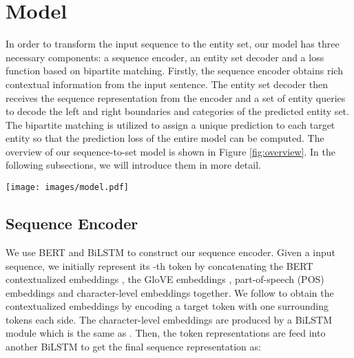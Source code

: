 \documentclass{article}
\begin{document}
\section{Model}
In order to transform the input sequence to the entity set, our model has three necessary components: a sequence encoder, an entity set decoder and a loss function based on bipartite matching. Firstly, the sequence encoder obtains rich contextual information from the input sentence. The entity set decoder then receives the sequence representation from the encoder and a set of entity queries to decode the left and right boundaries and categories of the predicted entity set. The bipartite matching is utilized to assign a unique prediction to each target entity so that the prediction loss of the entire model can be computed. The overview of our sequence-to-set model is shown in Figure \ref{fig:overview}. In the following subsections, we will introduce them in more detail.

\begin{figure*}[h]
  \centering
  \texttt{[image: images/model.pdf]}
  \caption{The architecture of our Sequence-to-Set Network. The representation of each token in sentence ``\textit{Some 2,500 Republican Guard forces surrendered.}" is fed into the entity set decoder along with the entity queries.
  Then the decoder transforms the queries to predicted entities. Finally, we score them by the loss function based on bipartite matching.}
   \label{fig:overview}
\end{figure*}

\subsection{Sequence Encoder}
We use BERT \cite{devlin-etal-2019-bert} and BiLSTM \cite{huang2015bidirectional} to construct our sequence encoder. Given a input sequence,  we initially represent its -th token by concatenating the BERT contextualized embeddings , the GloVE \cite{pennington-etal-2014-glove} embeddings , part-of-speech (POS) embeddings  and character-level embeddings  together. We follow \citep{yu2020named} to obtain the contextualized embeddings  by encoding a target token with one surrounding tokens each side. The character-level embeddings are produced by a BiLSTM module which is the same as \citep{lample2016neural}. Then, the token representations  are feed into another BiLSTM to get the final sequence representation  as:
\end{document}
